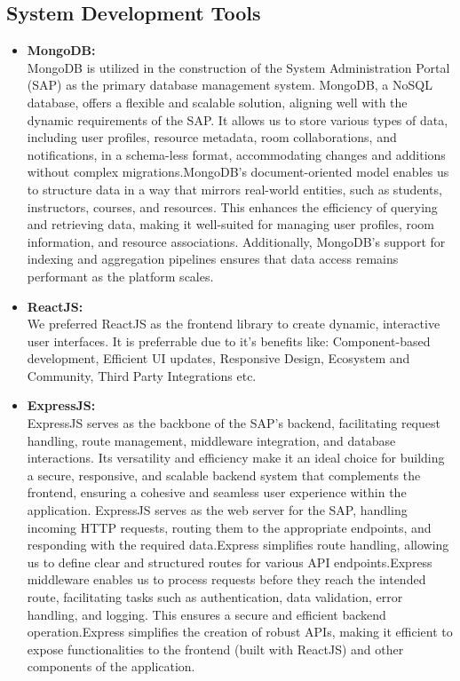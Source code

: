 \subsection{System Development Tools}
\begin{itemize}
    \item \textbf{MongoDB:}\\
    MongoDB is utilized in the construction of the System Administration Portal (SAP) as the primary database management system. MongoDB, a NoSQL database, offers a flexible and scalable solution, aligning well with the dynamic requirements of the SAP. It allows us to store various types of data, including user profiles, resource metadata, room collaborations, and notifications, in a schema-less format, accommodating changes and additions without complex migrations.MongoDB's document-oriented model enables us to structure data in a way that mirrors real-world entities, such as students, instructors, courses, and resources. This enhances the efficiency of querying and retrieving data, making it well-suited for managing user profiles, room information, and resource associations. Additionally, MongoDB's support for indexing and aggregation pipelines ensures that data access remains performant as the platform scales.\cite{mongo}
    \item \textbf{ReactJS:}\\
    We preferred ReactJS as the frontend library to create dynamic, interactive user interfaces. It is preferrable due to it's benefits like: Component-based development, Efficient UI updates, Responsive Design, Ecosystem and Community, Third Party Integrations etc.\cite{node}
    \item \textbf{ExpressJS:}\\
     ExpressJS serves as the backbone of the SAP's backend, facilitating request handling, route management, middleware integration, and database interactions. Its versatility and efficiency make it an ideal choice for building a secure, responsive, and scalable backend system that complements the frontend, ensuring a cohesive and seamless user experience within the application. ExpressJS serves as the web server for the SAP, handling incoming HTTP requests, routing them to the appropriate endpoints, and responding with the required data.Express simplifies route handling, allowing us to define clear and structured routes for various API endpoints.Express middleware enables us to process requests before they reach the intended route, facilitating tasks such as authentication, data validation, error handling, and logging. This ensures a secure and efficient backend operation.Express simplifies the creation of robust APIs, making it efficient to expose functionalities to the frontend (built with ReactJS) and other components of the application.\cite{express}

\end{itemize}
